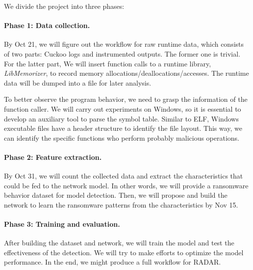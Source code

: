 \documentclass[letterpaper,twocolumn,10pt]{article}
\newcommand{\work}{\mbox{\textsc{RADAR}}\xspace}
\begin{document}
We divide the project into three phases:

\paragraph{Phase 1: Data collection.}

By Oct 21, we will figure out the workflow for raw runtime data, which consists of two parts: Cuckoo logs and instrumented outputs.
The former one is trivial. For the latter part, We will insert function calls to a runtime library, \textit{LibMemorizer}, to record memory allocations/deallocations/accesses. The runtime data will be dumped into a file for later analysis.

To better observe the program behavior, we need to grasp the information of the function caller.
We will carry out experiments on Windows, so it is essential to develop an auxiliary tool to parse the symbol table.
Similar to ELF, Windows executable files have a header structure to identify the file layout.
This way, we can identify the specific functions who perform probably malicious operations.

\paragraph{Phase 2: Feature extraction.} By Oct 31, we will count the collected data and extract the characteristics that could be fed to the network model.
In other words, we will provide a ransomware behavior dataset for model detection.
Then, we will propose and build the network to learn the ransomware patterns from the characteristics by Nov 15.

\paragraph{Phase 3: Training and evaluation.} After building the dataset and network, we will train the model and test the effectiveness of the detection.
We will try to make efforts to optimize the model performance.
In the end, we might produce a full workflow for \work.



{\footnotesize 
}


\end{document}

